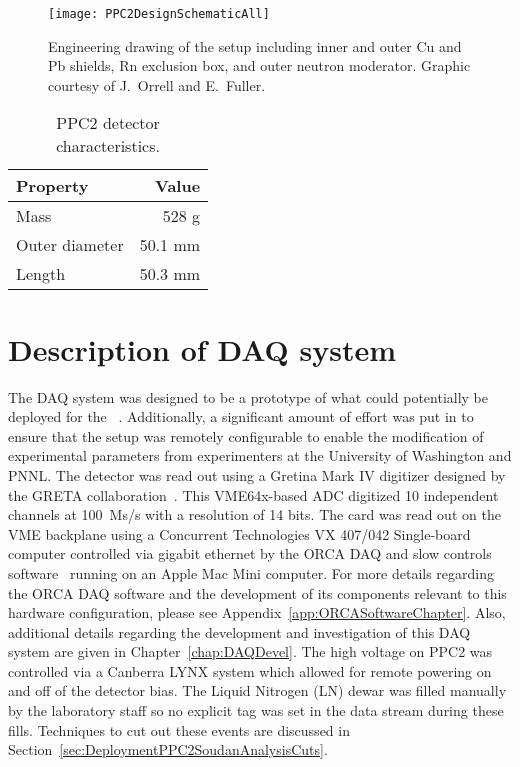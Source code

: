 			\begin{figure}
				\centering
				\texttt{[image: PPC2DesignSchematicAll]}
				\caption{Engineering drawing of the setup including inner and outer Cu and Pb shields, Rn exclusion box, 
				and outer neutron moderator.  Graphic courtesy of J.~Orrell and E.~Fuller.}
				\label{fig:PPC2Shield}
			\end{figure}
	
			\begin{table}
				\centering
				\begin{tabular}{l|r}
					Property & Value \\
					\hline
					\hline
					Mass & 528 g \\
					Outer diameter & 50.1 mm \\
					Length & 50.3 mm \\
					\hline
					\hline
				\end{tabular}
				\caption{PPC2 detector characteristics.  }
				\label{tab:PPC2Characteristics}
			\end{table}
	
	\section{Description of DAQ system}
	\label{sec:DeploymentPPC2SoudanDAQSystem}
	
	The DAQ system was designed to be a prototype of what could potentially be deployed for the \MJ~\minmod.  Additionally, a significant amount of effort was put in to ensure that the setup was remotely configurable to enable the modification of experimental parameters from experimenters at the University of Washington and PNNL.  The detector was read out using a Gretina Mark IV digitizer designed by the GRETA collaboration~\cite{Anderson:2009p1293}.  This VME64x-based ADC digitized 10 independent channels at 100~Ms/s with a resolution of 14 bits.  The card was read out on the VME backplane using a Concurrent Technologies VX 407/042 Single-board computer controlled via gigabit ethernet by the ORCA DAQ and slow controls software~\cite{ORCA} running on an Apple Mac Mini computer.  For more details regarding the ORCA DAQ software and the development of its components relevant to this hardware configuration, please see Appendix~\ref{app:ORCASoftwareChapter}.  Also, additional details regarding the development and investigation of this DAQ system are given in Chapter~\ref{chap:DAQDevel}. The high voltage on PPC2 was controlled via a Canberra LYNX system which allowed for remote powering on and off of the detector bias.  The Liquid Nitrogen (LN) dewar was filled manually by the laboratory staff so no explicit tag was set in the data stream during these fills.  Techniques to cut out these events are discussed in Section~\ref{sec:DeploymentPPC2SoudanAnalysisCuts}.
	    
